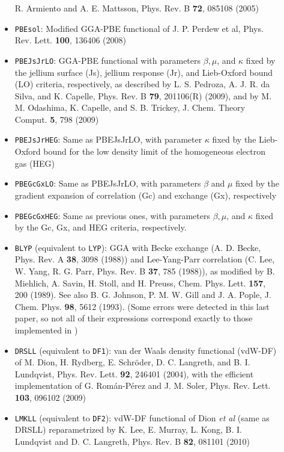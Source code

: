 \begin{description}
\begin{itemize}
R. Armiento and A. E. Mattsson, Phys. Rev. B \textbf{72}, 085108 (2005)
\item \texttt{PBEsol}: 
Modified GGA-PBE functional of 
J. P. Perdew et al, Phys. Rev. Lett. \textbf{100}, 136406 (2008)
\item \texttt{PBEJsJrLO}: 
GGA-PBE functional with parameters $\beta, \mu$, and $\kappa$ fixed by 
the jellium surface (Js), jellium response (Jr), 
and Lieb-Oxford bound (LO) criteria, respectively, as described by 
L. S. Pedroza, A. J. R. da Silva, and K. Capelle, 
Phys. Rev. B \textbf{79}, 201106(R) (2009), and by 
M. M. Odashima, K. Capelle, and S. B. Trickey, 
J. Chem. Theory Comput. \textbf{5}, 798 (2009)
\item \texttt{PBEJsJrHEG}: 
Same as PBEJsJrLO, with parameter $\kappa$ fixed by the  Lieb-Oxford bound 
for the low density limit of the homogeneous electron gas (HEG)
\item \texttt{PBEGcGxLO}:
Same as PBEJsJrLO, with parameters $\beta$ and $\mu$ fixed by the 
gradient expansion of correlation (Gc) and exchange (Gx), respectively
\item \texttt{PBEGcGxHEG}:
Same as previous ones, with parameters $\beta,\mu$, and $\kappa$ fixed by 
the Gc, Gx, and HEG criteria, respectively.
\item \texttt{BLYP} (equivalent to \texttt{LYP}): 
GGA with Becke exchange (A. D. Becke, Phys. Rev. A \textbf{38}, 3098 (1988)) 
and Lee-Yang-Parr correlation 
(C. Lee, W. Yang, R. G. Parr, Phys. Rev. B \textbf{37}, 785 (1988)), 
as modified by B. Miehlich, A. Savin, H. Stoll, and H. Preuss,
Chem. Phys. Lett. \textbf{157}, 200 (1989). 
See also B. G. Johnson, P. M. W. Gill and J. A. Pople,
J. Chem. Phys. \textbf{98}, 5612 (1993). (Some errors were detected in this
last paper, so not all of their expressions correspond exactly to those
implemented in \siesta)
\item \texttt{DRSLL} (equivalent to \texttt{DF1}):  
van der Waals  density functional (vdW-DF) 
of M. Dion, H. Rydberg, E. Schr\"{o}der, D. C. Langreth, and B. I. Lundqvist,
Phys. Rev. Lett. \textbf{92}, 246401 (2004), with the efficient implementation of 
G. Rom\'an-P\'erez and J. M. Soler, Phys. Rev. Lett. \textbf{103},  096102 (2009)
\item \texttt{LMKLL} (equivalent to \texttt{DF2}):  
vdW-DF functional of Dion \textit{et al} (same as DRSLL)
reparametrized by K. Lee, E. Murray, L. Kong, B. I. Lundqvist and 
D. C. Langreth, Phys. Rev. B \textbf{82}, 081101 (2010)

\end{itemize}
\end{description}
